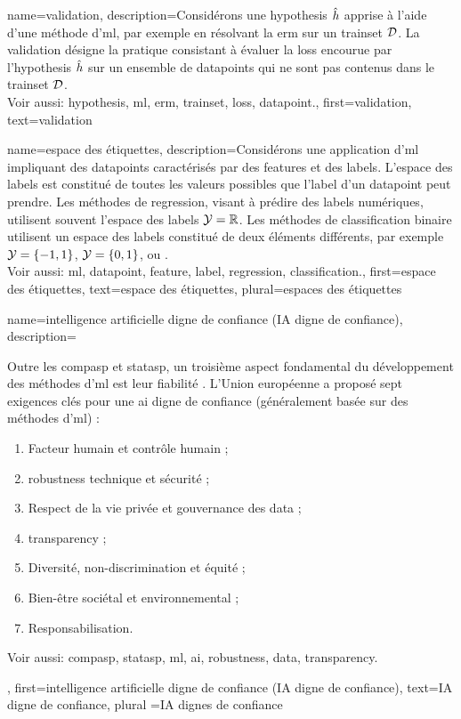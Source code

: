 {
	name={validation},
	description={Considérons une \gls{hypothesis} $\hat{h}$ apprise à l’aide d’une méthode d'\gls{ml}, par exemple en résolvant la \gls{erm} sur un \gls{trainset} $\mathcal{D}$. La validation désigne la pratique consistant à évaluer la \gls{loss} encourue par l’\gls{hypothesis} $\hat{h}$ sur un ensemble de \glspl{datapoint} qui ne sont pas contenus dans le \gls{trainset} $\mathcal{D}$.
		\\
		Voir aussi: \gls{hypothesis}, \gls{ml}, \gls{erm}, \gls{trainset}, \gls{loss}, \gls{datapoint}.},
	first={validation}, text={validation}
}

{
	name={espace des étiquettes},
	description={Considérons une application d'\gls{ml} impliquant des \glspl{datapoint} caractérisés par des \glspl{feature} et des \glspl{label}. L’espace des \glspl{label} est constitué de toutes les valeurs possibles que l'\gls{label} d’un \gls{datapoint} peut prendre. Les méthodes de \gls{regression}, visant à prédire des \glspl{label} numériques, utilisent souvent l’espace des \glspl{label} $\mathcal{Y} = \mathbb{R}$. Les méthodes de \gls{classification} binaire utilisent un espace des \glspl{label} constitué de deux éléments différents, par exemple $\mathcal{Y} =\{-1,1\}$, $\mathcal{Y}=\{0,1\}$, ou .\\
		Voir aussi: \gls{ml}, \gls{datapoint}, \gls{feature}, \gls{label}, \gls{regression}, \gls{classification}.}, 
	first={espace des étiquettes},
	text={espace des étiquettes}, plural={espaces des étiquettes}
}

{
	name={intelligence artificielle digne de confiance (IA digne de confiance)},
	description={Outre les \gls{compasp} et \gls{statasp}, un troisième aspect fondamental 
		du développement des méthodes d'\gls{ml} est leur fiabilité 
		\cite{pfau2024engineeringtrustworthyaideveloper}. 
		L’Union européenne a proposé sept exigences clés pour une \gls{ai} digne de confiance 
		(généralement basée sur des méthodes d'\gls{ml}) \cite{ALTAIEU}: 
		\begin{enumerate}[label=\arabic*)]
			\item Facteur humain et contrôle humain ;
			\item \Gls{robustness} technique et sécurité ;
			\item Respect de la vie privée et gouvernance des \gls{data} ;
			\item \Gls{transparency} ;
			\item Diversité, non-discrimination et équité ;
			\item Bien-être sociétal et environnemental ;
			\item Responsabilisation. 
		\end{enumerate}
	Voir aussi: \gls{compasp}, \gls{statasp}, \gls{ml}, \gls{ai}, \gls{robustness}, \gls{data}, \gls{transparency}.
	},
	first={intelligence artificielle digne de confiance (IA digne de confiance)},
	text={IA digne de confiance}, plural ={IA dignes de confiance}
}

